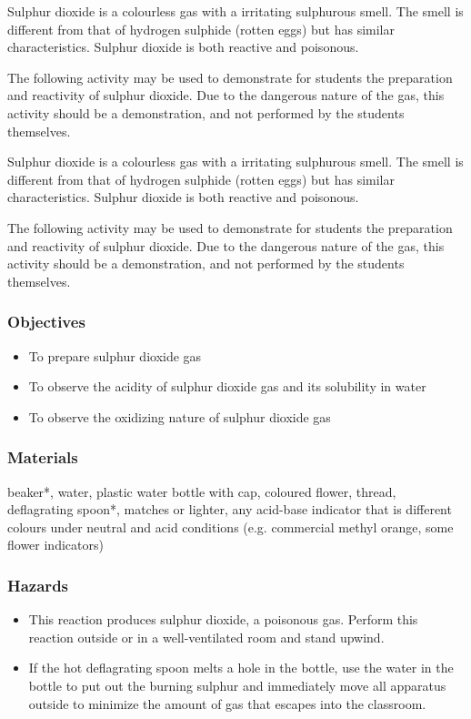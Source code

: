 Sulphur dioxide is a colourless gas with a irritating sulphurous smell. The smell is different from that of hydrogen sulphide (rotten eggs) but has similar characteristics. Sulphur dioxide is both reactive and poisonous.

The following activity may be used to demonstrate for students the preparation and reactivity of sulphur dioxide. Due to the dangerous nature of the gas, this activity should be a demonstration, and not performed by the students themselves.

Sulphur dioxide is a colourless gas with a irritating sulphurous smell. The smell is different from that of hydrogen sulphide (rotten eggs) but has similar characteristics. Sulphur dioxide is both reactive and poisonous.

The following activity may be used to demonstrate for students the preparation and reactivity of sulphur dioxide. Due to the dangerous nature of the gas, this activity should be a demonstration, and not performed by the students themselves.

\subsubsection{Objectives}
\begin{itemize}
\item{To prepare sulphur dioxide gas}
\item{To observe the acidity of sulphur dioxide gas and its solubility in water}
\item{To observe the oxidizing nature of sulphur dioxide gas}
\end{itemize}

\subsubsection{Materials}
beaker*, water, plastic water bottle with cap, coloured flower, thread, deflagrating spoon*, matches or lighter, any acid-base indicator that is different colours under neutral and acid conditions (e.g. commercial methyl orange, some flower indicators)

\subsubsection{Hazards}
\begin{itemize}
\item{This reaction produces sulphur dioxide, a poisonous gas. Perform this reaction outside or in a well-ventilated room and stand upwind.}
\item{If the hot deflagrating spoon melts a hole in the bottle, use the water in the bottle to put out the burning sulphur and immediately move all apparatus outside to minimize the amount of gas that escapes into the classroom.}
\end{itemize}

